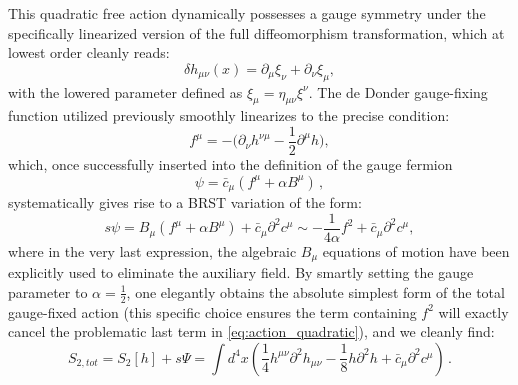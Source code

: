 This quadratic free action dynamically possesses a gauge symmetry under the specifically linearized version of the full diffeomorphism transformation, which at lowest order cleanly reads:
\begin{equation} \label{eq:linearized_gauge_sym}
    \delta h_{\mu\nu}(x) = \partial_\mu \xi_\nu + \partial_\nu \xi_\mu,
\end{equation}
with the lowered parameter defined as \(\xi_\mu = \eta_{\mu\nu}\xi^\nu\). The de Donder gauge-fixing function utilized previously smoothly linearizes to the precise condition:
\begin{equation} \label{eq:linearized_gauge_fix}
    f^\mu = -\Big( \partial_\nu h^{\nu\mu} - \frac{1}{2} \partial^\mu h \Big),
\end{equation}
which, once successfully inserted into the definition of the gauge fermion
\begin{equation} \label{eq:gauge_fermion_linear}
    \psi = \bar{c}_\mu(f^\mu + \alpha B^\mu) \, ,
\end{equation}
systematically gives rise to a BRST variation of the form:
\begin{equation} \label{eq:brst_variation_linear}
    s\psi = B_\mu(f^\mu + \alpha B^\mu) + \bar{c}_\mu \partial^2 c^\mu \sim -\frac{1}{4\alpha} f^2 + \bar{c}_\mu \partial^2 c^\mu,
\end{equation}
where in the very last expression, the algebraic \(B_\mu\) equations of motion have been explicitly used to eliminate the auxiliary field. By smartly setting the gauge parameter to \(\alpha = \frac{1}{2}\), one elegantly obtains the absolute simplest form of the total gauge-fixed action (this specific choice ensures the term containing \(f^2\) will exactly cancel the problematic last term in \eqref{eq:action_quadratic}), and we cleanly find:
\begin{equation} \label{eq:total_quadratic_action}
    S_{2,tot} = S_2[h] + s\Psi = \int d^4x \left( \frac{1}{4} h^{\mu\nu}\partial^2 h_{\mu\nu} - \frac{1}{8} h\partial^2 h + \bar{c}_\mu \partial^2 c^\mu \right) \, .
\end{equation}

